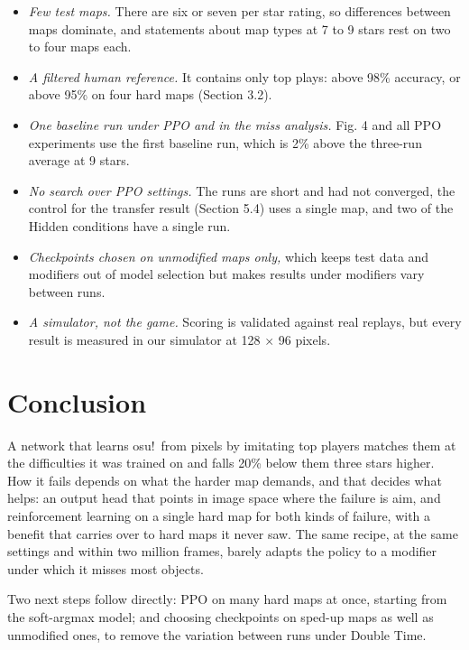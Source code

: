\documentclass[10pt,a4paper]{article}
\begin{document}
\begin{itemize}\setlength\itemsep{1.5pt}\setlength\parskip{0pt}\setlength\topsep{2pt}
\item \textit{Few test maps.} There are six or seven per star rating, so differences between maps dominate, and statements about map types at 7 to 9 stars rest on two to four maps each.
\item \textit{A filtered human reference.} It contains only top plays: above 98\% accuracy, or above 95\% on four hard maps (Section 3.2).
\item \textit{One baseline run under PPO and in the miss analysis.} Fig. 4 and all PPO experiments use the first baseline run, which is 2\% above the three-run average at 9 stars.
\item \textit{No search over PPO settings.} The runs are short and had not converged, the control for the transfer result (Section 5.4) uses a single map, and two of the Hidden conditions have a single run.
\item \textit{Checkpoints chosen on unmodified maps only,} which keeps test data and modifiers out of model selection but makes results under modifiers vary between runs.
\item \textit{A simulator, not the game.} Scoring is validated against real replays, but every result is measured in our simulator at 128 $\times$ 96 pixels.
\end{itemize}

\section{Conclusion}

A network that learns osu!\ from pixels by imitating top players matches them at the difficulties it was trained on and falls 20\% below them three stars higher. How it fails depends on what the harder map demands, and that decides what helps: an output head that points in image space where the failure is aim, and reinforcement learning on a single hard map for both kinds of failure, with a benefit that carries over to hard maps it never saw. The same recipe, at the same settings and within two million frames, barely adapts the policy to a modifier under which it misses most objects.


Two next steps follow directly: PPO on many hard maps at once, starting from the soft-argmax model; and choosing checkpoints on sped-up maps as well as unmodified ones, to remove the variation between runs under Double Time.
\end{document}
